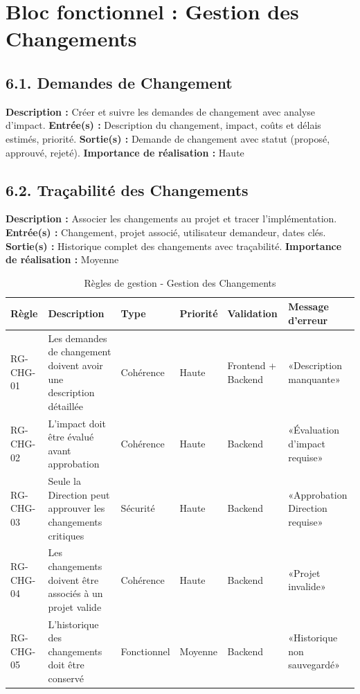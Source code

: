 \section{Bloc fonctionnel : Gestion des Changements}

\subsection{6.1. Demandes de Changement}
\textbf{Description :} Créer et suivre les demandes de changement avec analyse d'impact.
\textbf{Entrée(s) :} Description du changement, impact, coûts et délais estimés, priorité.
\textbf{Sortie(s) :} Demande de changement avec statut (proposé, approuvé, rejeté).
\textbf{Importance de réalisation :} Haute

\subsection{6.2. Traçabilité des Changements}
\textbf{Description :} Associer les changements au projet et tracer l'implémentation.
\textbf{Entrée(s) :} Changement, projet associé, utilisateur demandeur, dates clés.
\textbf{Sortie(s) :} Historique complet des changements avec traçabilité.
\textbf{Importance de réalisation :} Moyenne

\begin{table}[H]
\centering
\footnotesize
\begin{tabular}{|p{1.5cm}|p{3.5cm}|p{1.5cm}|p{1.5cm}|p{2cm}|p{2.5cm}|}
\hline
\textbf{Règle} & \textbf{Description} & \textbf{Type} & \textbf{Priorité} & \textbf{Validation} & \textbf{Message d'erreur} \\
\hline
RG-CHG-01 & Les demandes de changement doivent avoir une description détaillée & Cohérence & Haute & Frontend + Backend & «Description manquante» \\
\hline
RG-CHG-02 & L'impact doit être évalué avant approbation & Cohérence & Haute & Backend & «Évaluation d'impact requise» \\
\hline
RG-CHG-03 & Seule la Direction peut approuver les changements critiques & Sécurité & Haute & Backend & «Approbation Direction requise» \\
\hline
RG-CHG-04 & Les changements doivent être associés à un projet valide & Cohérence & Haute & Backend & «Projet invalide» \\
\hline
RG-CHG-05 & L'historique des changements doit être conservé & Fonctionnel & Moyenne & Backend & «Historique non sauvegardé» \\
\hline
\end{tabular}
\caption{Règles de gestion - Gestion des Changements}
\label{tab:rg_changements}
\end{table}

